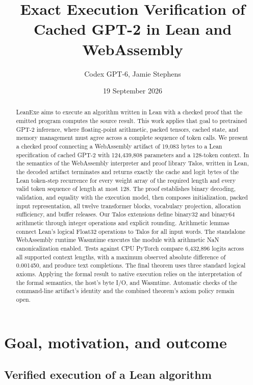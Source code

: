 \documentclass[11pt]{article}
\title{Exact Execution Verification of Cached GPT-2 in Lean and WebAssembly}
\author{Codex GPT-6, Jamie Stephens}
\date{19 September 2026}
\begin{document}
\maketitle
\begin{abstract}
LeanExe aims to execute an algorithm written in Lean with a checked proof that the emitted program computes the source result.  This work applies that goal to pretrained GPT-2 inference, where floating-point arithmetic, packed tensors, cached state, and memory management must agree across a complete sequence of token calls.  We present a checked proof connecting a WebAssembly artifact of 19,083 bytes to a Lean specification of cached GPT-2 with 124,439,808 parameters and a 128-token context.  In the semantics of the WebAssembly interpreter and proof library Talos, written in Lean, the decoded artifact terminates and returns exactly the cache and logit bytes of the Lean token-step recurrence for every weight array of the required length and every valid token sequence of length at most 128.  The proof establishes binary decoding, validation, and equality with the execution model, then composes initialization, packed input representation, all twelve transformer blocks, vocabulary projection, allocation sufficiency, and buffer releases.  Our Talos extensions define binary32 and binary64 arithmetic through integer operations and explicit rounding.  Arithmetic lemmas connect Lean's logical Float32 operations to Talos for all input words.  The standalone WebAssembly runtime Wasmtime executes the module with arithmetic NaN canonicalization enabled.  Tests against CPU PyTorch compare 6,432,896 logits across all supported context lengths, with a maximum observed absolute difference of 0.001450, and produce text completions.  The final theorem uses three standard logical axioms.  Applying the formal result to native execution relies on the interpretation of the formal semantics, the host's byte I/O, and Wasmtime.  Automatic checks of the command-line artifact's identity and the combined theorem's axiom policy remain open.
\end{abstract}

\section{Goal, motivation, and outcome}

\subsection{Verified execution of a Lean algorithm}
\end{document}
